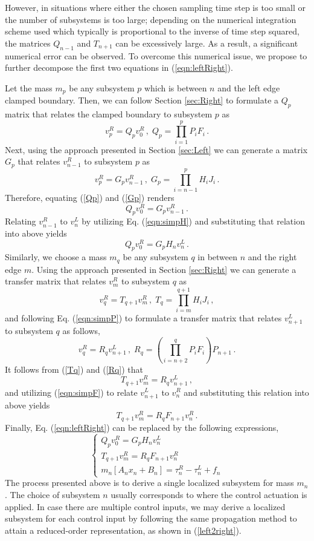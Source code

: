 \documentclass[11pt]{ucthesis}
\newcommand{\beq}{\begin{equation}}
\newcommand{\eeq}{\end{equation}}
\begin{document}
However, in situations where either the chosen sampling time step is too small or the number of subsystems is too large; depending on the numerical integration scheme used which typically is proportional to the inverse of time step squared, the matrices $Q_{n-1}$ and $T_{n+1}$ can be excessively large. As a result, a significant numerical error can be observed. To overcome this numerical issue, we propose to further decompose the first two equations in (\ref{eqn:leftRight}).

Let the mass $m_p$ be any subsystem $p$ which is between $n$ and the left edge clamped boundary. Then, we can follow Section \ref{sec:Right} to formulate a $Q_p$ matrix that relates the clamped boundary to subsystem $p$ as
\beq		\label{Qp}
v_p^R = Q_p v_0^R \,,\; Q_p = \prod_{i=1}^{p} P_i F_i \,.
\eeq
Next, using the approach presented in Section \ref{sec:Left} we can generate a matrix $G_p$ that relates $v_{n-1}^R$ to subsystem $p$ as 
\beq		\label{Gp}
v_{p}^R = G_{p} v_{n-1}^R \,,\;G_{p} = \prod_{i=n-1}^{p} H_i J_i\,.
\eeq
Therefore, equating (\ref{Qp}) and (\ref{Gp}) renders 
\[
Q_p v_0^R = G_{p} v_{n-1}^R\,.
\] 
Relating $v_{n-1}^R$ to $v_{n}^L$ by utilizing Eq. (\ref{eqn:simpH}) and substituting that relation into above yields
\beq		\label{QGp1}
Q_{p} v_0^R = G_{p} H_n v_{n}^L\,.
\eeq
Similarly, we choose a mass $m_q$ be any subsystem $q$ in between $n$ and the right edge $m$. Using the approach presented in Section \ref{sec:Right} we can generate a transfer matrix that relates $v_{m}^R$ to subsystem $q$ as   
\beq		\label{Tq}
v_{q}^R = T_{q+1} v_m^R \,,\; T_q = \prod_{i=m}^{q+1} H_i J_i \,,
\eeq
and following Eq. (\ref{eqn:simpP}) to formulate a transfer matrix that relates $v_{n+1}^{L}$ to subsystem $q$ as follows,
\beq		\label{Rq}
v_{q}^{R} = R_q v_{n+1}^{L} \,,\; R_q = \left ( \prod_{i=n+2}^{q} P_i F_i \right ) P_{n+1} \,.
\eeq
It follows from (\ref{Tq}) and (\ref{Rq}) that
\[
T_{q+1} v_m^R =  R_q v_{n+1}^{L} \,,
\]
and utilizing (\ref{eqn:simpF}) to relate $v_{n+1}^{L}$ to $v_n^R$ and substituting this relation into above yields
\beq		\label{RFq1}
T_{q+1} v_m^R =  R_q F_{n+1} v_{n}^{R} \,.
\eeq
Finally, Eq. (\ref{eqn:leftRight}) can be replaced by the following expressions,
\beq  \label{left2right}
\left \{ 
\begin{array}{l}
Q_{p} v_0^R = G_{p} H_n v_{n}^L \\
T_{q+1} v_m^R =  R_q F_{n+1} v_{n}^{R} \\
m_n \left [ A_n x_n+ B_n \right ] = \tau_n^R-\tau_n^L +f_n
\end{array}
\right .
\eeq
The process presented above is to derive a single localized subsystem for mass $m_n$. The choice of subsystem $n$ usually corresponds to where the control actuation is applied. In case there are multiple control inputs, we may derive a localized subsystem for each control input by following the same propagation method to attain a reduced-order representation, as shown in (\ref{left2right}).  
\end{document}

